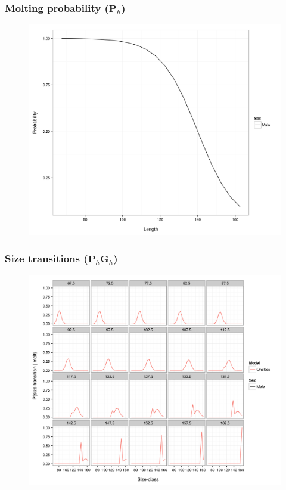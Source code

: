 \documentclass{beamer}
\begin{document}

\begin{frame}
\frametitle{Molting probability ($\boldsymbol{P}_h$)}
\begin{figure}[!htbp]
  \centering
  \includegraphics[width=0.75\linewidth]{../../examples/bbrkc/OneSex/figure/molt_prob.png}
\end{figure}
\end{frame}


\begin{frame}
\frametitle{Size transitions  ($\boldsymbol{P}_h \boldsymbol{G}_h$)}
\begin{figure}[!htbp]
  \centering
  \includegraphics[width=0.75\linewidth]{../../examples/bbrkc/OneSex/figure/size_transition.png}
\end{figure}
\end{frame}
\end{document}

